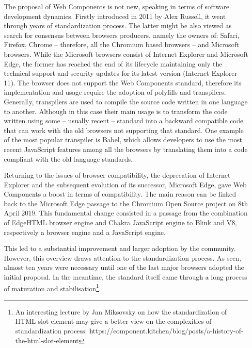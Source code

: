 The proposal of Web Components is not new, speaking in terms of software development dynamics. Firstly introduced in 2011 by Alex Russell, it went through years of standardization process. The latter might be also viewed as search for consensus between browsers producers, namely the owners of: Safari, Firefox, Chrome – therefore, all the Chromium based browsers – and Microsoft browsers. While the Microsoft browsers consist of Internet Explorer and Microsoft Edge, the former has reached the end of its lifecycle maintaining only the technical support and security updates for its latest version (Internet Explorer 11). The browser does not support the Web Components standard, therefore its implementation and usage require the adoption of polyfills and transpilers.
Generally, transpilers are used to compile the source code written in one language to another. Although in this case their main usage is to transform the code written using some – usually recent – standard into a backward compatible code that can work with the old browsers not supporting that standard. One example of the most popular transpiler is Babel, which allows developers to use the most recent JavaScript features among all the browsers by translating them into a code compliant with the old language standards.


Returning to the issues of browser compatibility, the deprecation of Internet Explorer and the subsequent evolution of its successor, Microsoft Edge, gave Web Components a boost in terms of compatibility. The main reason can be linked back to the Microsoft Edge passage to the Chromium Open Source project on 8th April 2019. This fundamental change consisted in a passage from the combination of EdgeHTML browser engine and Chakra JavaScript engine to Blink and V8, respectively a browser engine and a JavaScript engine.

This led to a substantial improvement and larger adoption by the community. However, this overview draws attention to the standardization process. As seen, almost ten years were necessary until one of the last major browsers adopted the initial proposal. In the meantime, the standard itself came through a long process of maturation and stabilisation\footnote{An interesting lecture by Jan Miksovsky on how the standardization of HTML slot element may give a better view on the complexities of standardization process: https://component.kitchen/blog/posts/a-history-of-the-html-slot-element}.


